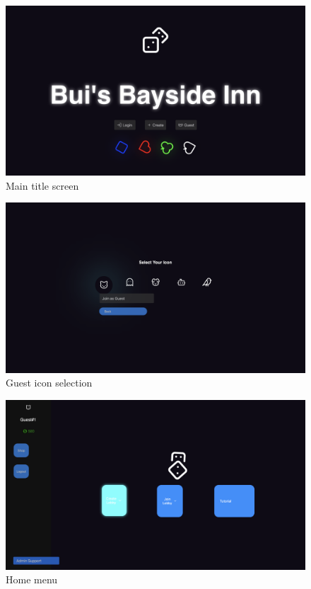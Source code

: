\begin{figure}[h!]
\centering
\includegraphics[width=1\linewidth]{UI Screenshot 1.png}
\caption{Main title screen}
\label{fig:ui1}
\end{figure}

\begin{figure}[h!]
\centering
\includegraphics[width=1\linewidth]{UI Screenshot 2.png}
\caption{Guest icon selection}
\label{fig:ui2}
\end{figure}

\begin{figure}[h!]
\centering
\includegraphics[width=1\linewidth]{UI Screenshot 3.png}
\caption{Home menu}
\label{fig:ui3}
\end{figure}

